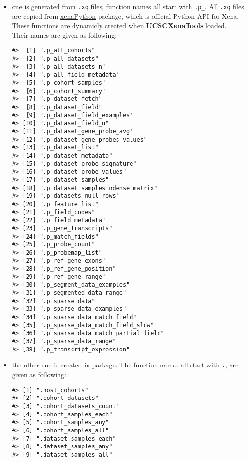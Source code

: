 \documentclass[nofonts,]{tufte-handout}
\begin{document}
\begin{itemize}
\item
  one is generated from
  \href{https://github.com/ShixiangWang/UCSCXenaTools/tree/master/inst/queries}{\texttt{.xq}
  files}, function names all start with \texttt{.p\_}. All \texttt{.xq}
  files are copied from
  \href{https://github.com/ucscXena/xenaPython}{xenaPython} package,
  which is official Python API for Xena. These functions are dynamicly
  created when \textbf{UCSCXenaTools} loaded. Their names are given as
  following:

\begin{verbatim}
#>  [1] ".p_all_cohorts"                    
#>  [2] ".p_all_datasets"                   
#>  [3] ".p_all_datasets_n"                 
#>  [4] ".p_all_field_metadata"             
#>  [5] ".p_cohort_samples"                 
#>  [6] ".p_cohort_summary"                 
#>  [7] ".p_dataset_fetch"                  
#>  [8] ".p_dataset_field"                  
#>  [9] ".p_dataset_field_examples"         
#> [10] ".p_dataset_field_n"                
#> [11] ".p_dataset_gene_probe_avg"         
#> [12] ".p_dataset_gene_probes_values"     
#> [13] ".p_dataset_list"                   
#> [14] ".p_dataset_metadata"               
#> [15] ".p_dataset_probe_signature"        
#> [16] ".p_dataset_probe_values"           
#> [17] ".p_dataset_samples"                
#> [18] ".p_dataset_samples_ndense_matrix"  
#> [19] ".p_datasets_null_rows"             
#> [20] ".p_feature_list"                   
#> [21] ".p_field_codes"                    
#> [22] ".p_field_metadata"                 
#> [23] ".p_gene_transcripts"               
#> [24] ".p_match_fields"                   
#> [25] ".p_probe_count"                    
#> [26] ".p_probemap_list"                  
#> [27] ".p_ref_gene_exons"                 
#> [28] ".p_ref_gene_position"              
#> [29] ".p_ref_gene_range"                 
#> [30] ".p_segment_data_examples"          
#> [31] ".p_segmented_data_range"           
#> [32] ".p_sparse_data"                    
#> [33] ".p_sparse_data_examples"           
#> [34] ".p_sparse_data_match_field"        
#> [35] ".p_sparse_data_match_field_slow"   
#> [36] ".p_sparse_data_match_partial_field"
#> [37] ".p_sparse_data_range"              
#> [38] ".p_transcript_expression"
\end{verbatim}
\item
  the other one is created in package. The function names all start with
  \texttt{.}, are given as following:

\begin{verbatim}
#> [1] ".host_cohorts"         
#> [2] ".cohort_datasets"      
#> [3] ".cohort_datasets_count"
#> [4] ".cohort_samples_each"  
#> [5] ".cohort_samples_any"   
#> [6] ".cohort_samples_all"   
#> [7] ".dataset_samples_each" 
#> [8] ".dataset_samples_any"  
#> [9] ".dataset_samples_all"
\end{verbatim}
\end{itemize}
\end{document}
